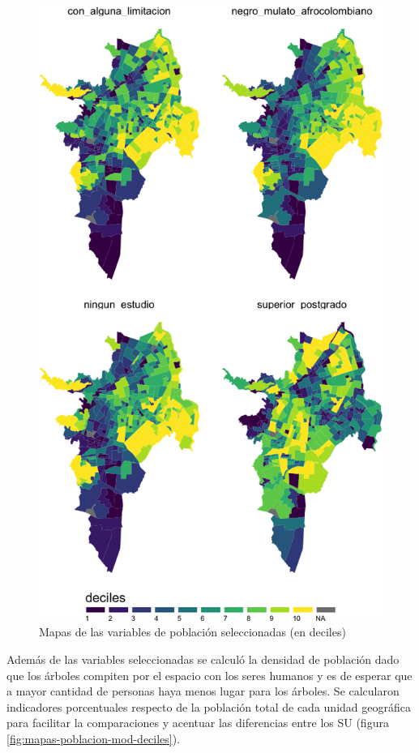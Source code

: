 \documentclass[12pt,a4paper,openany]{book}
\theoremstyle{definition}
\theoremstyle{definition}
\theoremstyle{definition}
\theoremstyle{remark}
\begin{document}
\begin{figure}

{\centering \includegraphics[width=1\linewidth]{tesis-unigis_files/figure-latex/mapas-poblacion-deciles-1} 

}

\caption{Mapas de las variables de población seleccionadas (en deciles)}\label{fig:mapas-poblacion-deciles}
\end{figure}

Además de las variables seleccionadas se calculó la densidad de
población dado que los árboles compiten por el espacio con los seres
humanos y es de esperar que a mayor cantidad de personas haya menos
lugar para los árboles. Se calcularon indicadores porcentuales respecto
de la población total de cada unidad geográfica para facilitar la
comparaciones y acentuar las diferencias entre los SU (figura
\ref{fig:mapas-poblacion-mod-deciles}).
\end{document}
